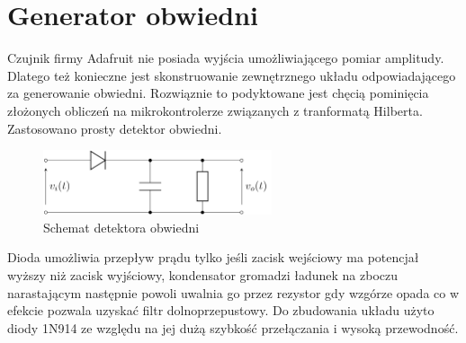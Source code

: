 \documentclass[eng,printmode]{mgr}
\begin{document}
\section{Generator obwiedni}
Czujnik firmy Adafruit nie posiada wyjścia umożliwiającego pomiar amplitudy. Dlatego też konieczne jest skonstruowanie zewnętrznego układu odpowiadającego za generowanie obwiedni. Rozwiąznie to podyktowane jest chęcią pominięcia złożonych obliczeń na mikrokontrolerze związanych z tranformatą Hilberta. Zastosowano prosty detektor obwiedni.
\begin{figure}

    \centering

  \includegraphics[width=0.6\textwidth, angle=0]{obwiednia.png}

    \caption{Schemat detektora obwiedni}


\end{figure}
\newpage
\noindent Dioda umożliwia przepływ prądu tylko jeśli zacisk wejściowy ma potencjał wyższy niż zacisk wyjściowy, kondensator gromadzi ładunek na zboczu narastającym następnie powoli uwalnia go przez rezystor gdy wzgórze opada co w efekcie pozwala uzyskać  filtr dolnoprzepustowy. Do zbudowania układu użyto diody 1N914 ze względu na jej dużą szybkość przełączania i wysoką przewodność. 
\end{document}
